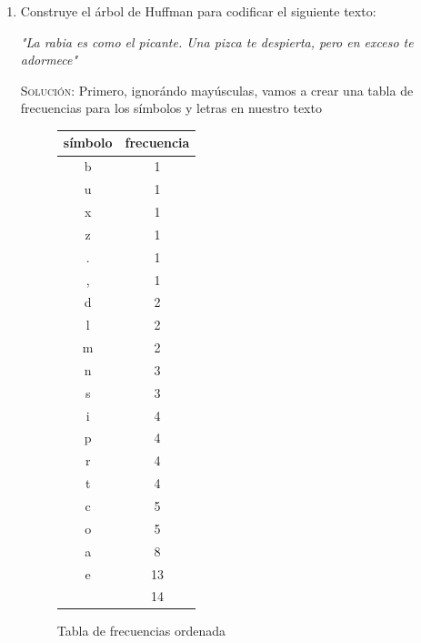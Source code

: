 \documentclass[letterpaper,11pt]{article}
\begin{document}
\begin{enumerate}
    \newpage
    \item Construye el árbol de Huffman para codificar el siguiente texto:
    \begin{center}
        \textit{"La rabia es como el picante. Una pizca te despierta, pero
        en exceso te adormece"}
    \end{center}
    
    \textsc{Solución:} Primero, ignorándo mayúsculas, vamos a crear una tabla 
    de frecuencias para los símbolos y letras en nuestro texto
    \begin{figure}[H]
        \centering
        \begin{tabular}{|c|c|}
            \hline
            símbolo & frecuencia \\
            \hline
            b & 1 \\
            \hline
            u & 1 \\
            \hline
            x & 1 \\
            \hline
            z & 1 \\
            \hline
            . & 1 \\
            \hline
            , & 1 \\
            \hline
            d & 2 \\
            \hline
            l & 2 \\
            \hline
            m & 2 \\
            \hline
            n & 3 \\
            \hline
            s & 3 \\
            \hline
            i & 4 \\
            \hline
            p & 4 \\
            \hline
            r & 4 \\
            \hline
            t & 4 \\
            \hline
            c & 5 \\
            \hline
            o & 5 \\
            \hline
            a & 8 \\
            \hline
            e & 13 \\
            \hline
            \texttt{\char32} & 14 \\
            \hline
        \end{tabular}
        \caption{Tabla de frecuencias ordenada}
    \end{figure}


\end{enumerate}
\end{document}
